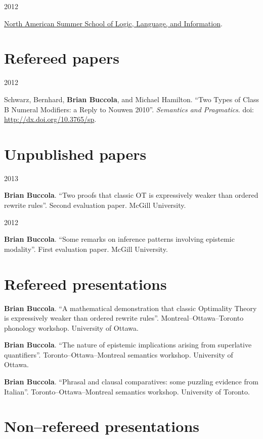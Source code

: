 \documentclass[11pt,letterpaper]{article}
\newcommand{\name}{Brian Buccola}
\newcommand{\cvitem}[2]{%
  \begin{minipage}[t]{0.24\textwidth}
    #1 %
  \end{minipage}
  \hfill
  \begin{minipage}[t]{0.74\textwidth}
    #2 %
  \end{minipage}
}
\begin{document}
\cvitem{2012 \shortmonthname[6]}{\href{http://nasslli2012.com/about}{North
American Summer School of Logic, Language, and Information}.}



\section*{Refereed papers}

\cvitem{2012}{Schwarz, Bernhard, \textbf{\name}, and Michael Hamilton. ``Two
Types of Class B Numeral Modifiers: a Reply to Nouwen 2010''.  \textit{Semantics
and Pragmatics}. doi: \url{http://dx.doi.org/10.3765/sp}.}



\section*{Unpublished papers}

\cvitem{2013}{\textbf{\name}. ``Two proofs that classic OT is expressively
weaker than ordered rewrite rules''. Second evaluation paper. McGill
University.}

\cvitem{2012}{\textbf{\name}. ``Some remarks on inference patterns involving
epistemic modality''. First evaluation paper. McGill University.}



\section*{Refereed presentations}

\cvitem{}{\textbf{\name}. ``A mathematical
demonstration that classic Optimality Theory is expressively weaker than
ordered rewrite rules''. Montreal--Ottawa--Toronto phonology workshop.
University of Ottawa.}

\cvitem{}{\textbf{\name}. ``The nature of epistemic
implications arising from superlative quantifiers''. Toronto--Ottawa--Montreal
semantics workshop. University of Ottawa.}

\cvitem{}{\textbf{\name}. ``Phrasal and clausal
comparatives: some puzzling evidence from Italian''. Toronto--Ottawa--Montreal
semantics workshop.  University of Toronto.}



\section*{Non--refereed presentations}
\end{document}
